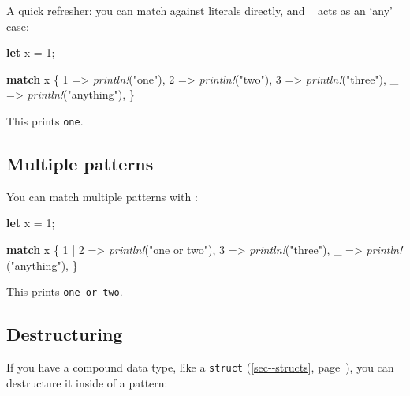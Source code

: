 \documentclass[a4paper,]{book}
\renewcommand*{\hyperref}[2][\ar]{%
  \def\ar{#2}%
  #2 (\autoref{#1}, page~\pageref{#1})}
\newenvironment{Shaded}{\begin{snugshade}}{\end{snugshade}}
\newcommand{\KeywordTok}[1]{\textcolor[rgb]{0.13,0.29,0.53}{\textbf{{#1}}}}
\newcommand{\DecValTok}[1]{\textcolor[rgb]{0.00,0.00,0.81}{{#1}}}
\newcommand{\StringTok}[1]{\textcolor[rgb]{0.31,0.60,0.02}{{#1}}}
\newcommand{\PreprocessorTok}[1]{\textcolor[rgb]{0.56,0.35,0.01}{\textit{{#1}}}}
\newcommand{\NormalTok}[1]{{#1}}
\begin{document}
A quick refresher: you can match against literals directly, and
\texttt{\_} acts as an `any' case:

\begin{Shaded}
\begin{Highlighting}[]
\KeywordTok{let} \NormalTok{x = }\DecValTok{1}\NormalTok{;}

\KeywordTok{match} \NormalTok{x \{}
    \DecValTok{1} \NormalTok{=> }\PreprocessorTok{println!}\NormalTok{(}\StringTok{"one"}\NormalTok{),}
    \DecValTok{2} \NormalTok{=> }\PreprocessorTok{println!}\NormalTok{(}\StringTok{"two"}\NormalTok{),}
    \DecValTok{3} \NormalTok{=> }\PreprocessorTok{println!}\NormalTok{(}\StringTok{"three"}\NormalTok{),}
    \NormalTok{_ => }\PreprocessorTok{println!}\NormalTok{(}\StringTok{"anything"}\NormalTok{),}
\NormalTok{\}}
\end{Highlighting}
\end{Shaded}

This prints \texttt{one}.

\subsection{Multiple patterns}\label{multiple-patterns}

You can match multiple patterns with \texttt{\textbar{}}:

\begin{Shaded}
\begin{Highlighting}[]
\KeywordTok{let} \NormalTok{x = }\DecValTok{1}\NormalTok{;}

\KeywordTok{match} \NormalTok{x \{}
    \DecValTok{1} \NormalTok{| }\DecValTok{2} \NormalTok{=> }\PreprocessorTok{println!}\NormalTok{(}\StringTok{"one or two"}\NormalTok{),}
    \DecValTok{3} \NormalTok{=> }\PreprocessorTok{println!}\NormalTok{(}\StringTok{"three"}\NormalTok{),}
    \NormalTok{_ => }\PreprocessorTok{println!}\NormalTok{(}\StringTok{"anything"}\NormalTok{),}
\NormalTok{\}}
\end{Highlighting}
\end{Shaded}

This prints \texttt{one\ or\ two}.

\subsection{Destructuring}\label{destructuring}

If you have a compound data type, like a
\hyperref[sec--structs]{\texttt{struct}}, you can destructure it inside
of a pattern:
\end{document}
